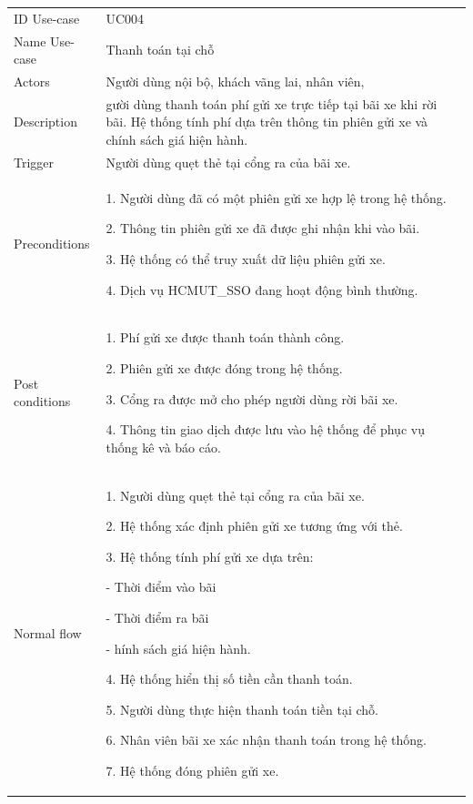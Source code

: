 \begin{center}
    \begin{tabular}{|m{2.5cm}|m{13cm}|}
    \hline
        ID Use-case  & UC004 \\ 
        Name Use-case & Thanh toán tại chỗ \\ 
    \hline
        Actors & Người dùng nội bộ, khách vãng lai, nhân viên, \\
    \hline
        Description & gười dùng thanh toán phí gửi xe trực tiếp tại bãi xe khi rời bãi. Hệ thống tính phí dựa trên thông tin phiên gửi xe và chính sách giá hiện hành.\\
    \hline
        Trigger & Người dùng quẹt thẻ tại cổng ra của bãi xe.\\
    \hline
        Preconditions & 
        1. Người dùng đã có một phiên gửi xe hợp lệ trong hệ thống.
        
        2. Thông tin phiên gửi xe đã được ghi nhận khi vào bãi.

        3. Hệ thống có thể truy xuất dữ liệu phiên gửi xe.
        
        4. Dịch vụ HCMUT\_SSO đang hoạt động bình thường.\\
    \hline
        Post conditions & 
        1. Phí gửi xe được thanh toán thành công.
        
        2. Phiên gửi xe được đóng trong hệ thống.
        
        3. Cổng ra được mở cho phép người dùng rời bãi xe.
        
        4. Thông tin giao dịch được lưu vào hệ thống để phục vụ thống kê và báo cáo.\\
    \hline
        Normal flow & 
        1. Người dùng quẹt thẻ tại cổng ra của bãi xe.
        
        2. Hệ thống xác định phiên gửi xe tương ứng với thẻ.
        
        3. Hệ thống tính phí gửi xe dựa trên:

            - Thời điểm vào bãi

            - Thời điểm ra bãi

            - hính sách giá hiện hành.
        
        4. Hệ thống hiển thị số tiền cần thanh toán.
        
        5. Người dùng thực hiện thanh toán tiền  tại chỗ.
        
        6. Nhân viên bãi xe xác nhận thanh toán trong hệ thống.
        
        7. Hệ thống đóng phiên gửi xe.
        

\end{tabular}
\end{center}
